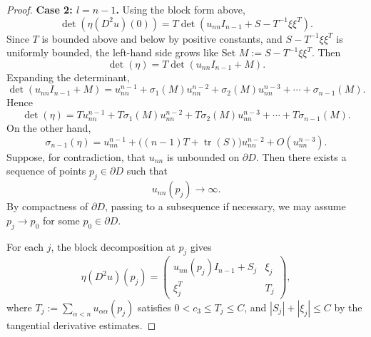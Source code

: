 \documentclass[reqno,a4paper]{amsart}
\numberwithin{equation}{section}
\begin{document}
\begin{proof}
		\noindent\textbf{Case 2: $l=n-1$.}
		Using the block form above,
		\[
		\det(\eta(D^2 u)(0)) = T \det\left( u_{nn} I_{n-1} + S - T^{-1} \xi \xi^T \right).
		\]
		Since $T$ is bounded above and below by positive constants, and $S - T^{-1}\xi\xi^T$ is uniformly bounded, the left-hand side grows like
		Set $M:=S-T^{-1}\xi\xi^T$. Then
		\[
		\det(\eta)=T\det(u_{nn}I_{n-1}+M).
		\]
		Expanding the determinant,
		\begin{equation}
			\det(u_{nn} I_{n-1} + M)
			=
			u_{nn}^{n-1}
			+
			\sigma_1(M) u_{nn}^{n-2}
			+
			\sigma_2(M) u_{nn}^{n-3}
			+
			\cdots
			+
			\sigma_{n-1}(M).
		\end{equation}
		Hence
		\begin{equation}
			\det(\eta)
			=
			T u_{nn}^{n-1}
			+
			T\sigma_1(M) u_{nn}^{n-2}
			+
			T\sigma_2(M) u_{nn}^{n-3}
			+
			\cdots
			+
			T\sigma_{n-1}(M).
		\end{equation}
		On the other hand,
		\begin{equation}
			\sigma_{n-1}(\eta)
			=
			u_{nn}^{n-1}
			+
			\big((n-1)T+\operatorname{tr}(S)\big)u_{nn}^{n-2}
			+
			O(u_{nn}^{n-3}).
		\end{equation}
		Suppose, for contradiction, that $u_{nn}$ is unbounded on $\partial D$. 
		Then there exists a sequence of points $p_j \in \partial D$ such that
		\begin{equation}
			u_{nn}(p_j) \to \infty.
		\end{equation}
		By compactness of $\partial D$, passing to a subsequence if necessary, 
		we may assume $p_j \to p_0$ for some $p_0 \in \partial D$.
		
		For each $j$, the block decomposition at $p_j$ gives
		\[
		\eta(D^2u)(p_j)=\begin{pmatrix}
			u_{nn}(p_j)I_{n-1}+S_j & \xi_j\\
			\xi_j^T & T_j
		\end{pmatrix},
		\]
		where $T_j:=\sum_{\alpha<n}u_{\alpha\alpha}(p_j)$ satisfies $0<c_3\le T_j\le C$, and $|S_j|+|\xi_j|\le C$ by the tangential derivative estimates.
		

\end{proof}
\end{document}
